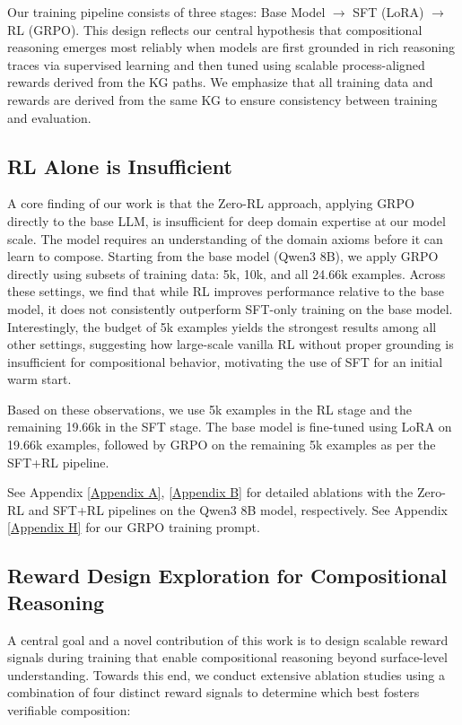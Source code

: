 \documentclass{article}
\theoremstyle{plain}
\theoremstyle{definition}
\theoremstyle{remark}
\begin{document}
Our training pipeline consists of three stages: Base Model $\rightarrow$ SFT (LoRA) $\rightarrow$ RL (GRPO). This design reflects our central hypothesis that compositional reasoning emerges most reliably when models are first grounded in rich reasoning traces via supervised learning and then tuned using scalable process-aligned rewards derived from the KG paths. We emphasize that all training data and rewards are derived from the same KG to ensure consistency between training and evaluation. 

\subsection{RL Alone is Insufficient}
\label{RL_ablations}
A core finding of our work is that the Zero-RL approach, applying GRPO directly to the base LLM, is insufficient for deep domain expertise at our model scale. The model requires an understanding of the domain axioms before it can learn to compose. Starting from the base model (Qwen3 8B), we apply GRPO directly using subsets of training data: 5k, 10k, and all 24.66k examples. Across these settings, we find that while RL improves performance relative to the base model, it does not consistently outperform SFT-only training on the base model. Interestingly, the budget of 5k examples yields the strongest results among all other settings, suggesting how large-scale vanilla RL without proper grounding is insufficient for compositional behavior, motivating the use of SFT for an initial warm start. 

Based on these observations, we use 5k examples in the RL stage and the remaining 19.66k in the SFT stage. The base model is fine-tuned using LoRA on 19.66k examples, followed by GRPO on the remaining 5k examples as per the SFT+RL pipeline.

See Appendix \ref{Appendix A}, \ref{Appendix B} for detailed ablations with the Zero-RL and SFT+RL pipelines on the Qwen3 8B model, respectively. See Appendix \ref{Appendix H} for our GRPO training prompt.

\subsection{Reward Design Exploration for Compositional Reasoning} %
A central goal and a novel contribution of this work is to design scalable reward signals during training that enable compositional reasoning beyond surface-level understanding. Towards this end, we conduct extensive ablation studies using a combination of four distinct reward signals to determine which best fosters verifiable composition:
\end{document}
